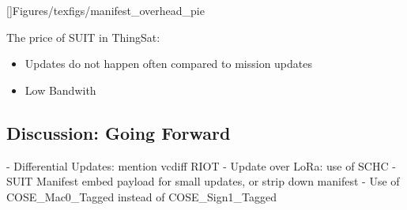 

[]{Figures/texfigs/manifest_overhead_pie}



The price of SUIT in ThingSat:

\begin{itemize}
    \item Updates do not happen often compared to mission updates
    \item Low Bandwith
\end{itemize}

\subsection{Discussion: Going Forward}
- Differential Updates: mention vcdiff RIOT
- Update over LoRa: use of SCHC
- SUIT Manifest embed payload for small updates, or strip down manifest
- Use of COSE\_Mac0\_Tagged instead of COSE\_Sign1\_Tagged
